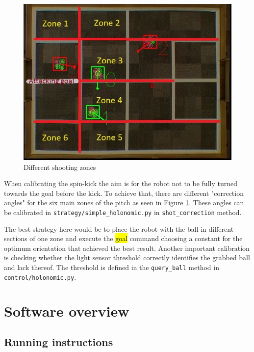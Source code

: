 \documentclass[a4paper,12pt]{article}
\newcommand{\hg}[1]{\hl{\ttfamily #1}}
\begin{document}
\begin{figure}
\vspace{-.5cm}
\includegraphics[scale=.4]{zones.jpg}
\caption{Different shooting zones}
\label{fig:zones}
\vspace{-.5cm}
\end{figure}
When calibrating the spin-kick the aim is for the robot not to be fully turned towards the goal before the kick. To achieve that, there are different "correction angles" for the six main zones of the pitch as seen in Figure \ref{fig:zones}. These angles can be calibrated in \texttt{strategy/simple\_holonomic.py} in \texttt{shot\_correction} method.

The best strategy here would be to place the robot with the ball in different sections of one zone and execute the \hg{goal} command choosing a constant for the optimum orientation that achieved the best result. Another important calibration is checking whether the light sensor threshold correctly identifies the grabbed ball and lack thereof. The threshold is defined in the \texttt{query\_ball} method in \texttt{control/holonomic.py}.

\section{Software overview}

\subsection{Running instructions} \label{running}
\end{document}
